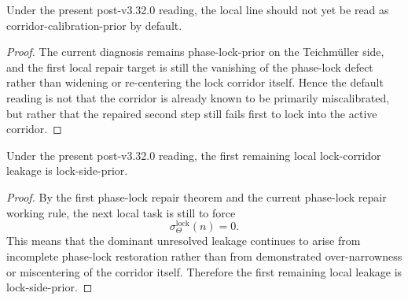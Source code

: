 \begin{proposition}
\label{prop:current-line-is-not-corridor-calibration-prior-by-default}
Under the present post-v3.32.0 reading, the local line should not yet be read as corridor-calibration-prior by default.
\end{proposition}

\begin{proof}
The current diagnosis remains phase-lock-prior on the Teichm\"uller side, and the first local repair target is still the vanishing of the phase-lock defect rather than widening or re-centering the lock corridor itself. Hence the default reading is not that the corridor is already known to be primarily miscalibrated, but rather that the repaired second step still fails first to lock into the active corridor.
\end{proof}

\begin{proposition}
\label{prop:current-line-is-lock-side-prior-on-the-leakage-level}
Under the present post-v3.32.0 reading, the first remaining local lock-corridor leakage is lock-side-prior.
\end{proposition}

\begin{proof}
By the first phase-lock repair theorem and the current phase-lock repair working rule, the next local task is still to force
\[
  \sigma_{\Theta}^{\mathrm{lock}}(n)=0.
\]
This means that the dominant unresolved leakage continues to arise from incomplete phase-lock restoration rather than from demonstrated over-narrowness or miscentering of the corridor itself. Therefore the first remaining local leakage is lock-side-prior.
\end{proof}

